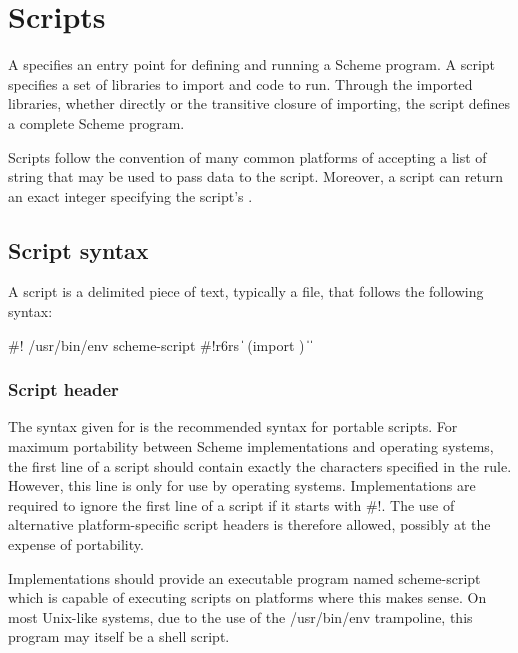\chapter{Scripts}
\label{scriptchapter}

A  specifies an entry point for defining and running
a Scheme program.  A script specifies a set of libraries to import and
code to run.  Through the imported libraries, whether directly or the
transitive closure of importing, the script defines a complete Scheme
program.

Scripts follow the convention of many common platforms of accepting a
list of string  that may be used to
pass data to the script.  Moreover, a script can return an exact
integer specifying the script's .

\section{Script syntax}

A script is a delimited piece of text, typically a file, that follows
the following syntax:

\begin{grammar}
 \: \#! /usr/bin/env scheme-script
  \> 
  \> 
 \: \#!r6rs  
  \> \|  
 \: (import )
 \:  
 \: 
\> \| 
\> \| 
\end{grammar}
\subsection{Script header}

The syntax given for  is the recommended syntax for 
portable scripts.  For maximum portability between Scheme implementations
and operating systems, the first line of a script should contain exactly 
the characters specified in the rule.  However, this line is only for use 
by operating systems.  Implementations are required to ignore the first 
line of a script if it starts with {\cf \#!}.  The use of alternative 
platform-specific script headers is therefore allowed, possibly at the 
expense of portability.

Implementations should provide an executable program named {\cf scheme-script}
which is capable of executing scripts on platforms where this makes
sense.  On most Unix-like systems, due to the 
use of the {\cf /usr/bin/env} trampoline, this program may itself be a shell 
script.

